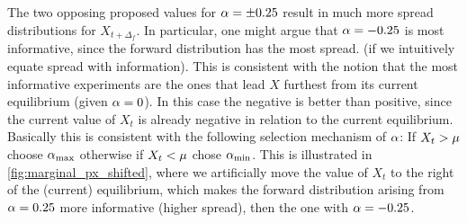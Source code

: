 The two opposing proposed values for $\alpha = \pm 0.25$ result in much
more spread distributions for $X_{t+\Delta_f}$. In particular, one might argue that
$\alpha=-0.25$ is most informative, since the forward distribution has the most
spread. (if we intuitively equate spread with information). This is consistent
with the notion that the most informative experiments are the ones that lead $X$
furthest from its current equilibrium (given $\alpha=0$). In this case the negative
is better than positive, since the current value of $X_t$ is already negative in
relation to the current equilibrium. Basically this is consistent with the
following selection mechanism of $\alpha$: If $X_t > {\mu }$ choose ${ \alpha_{\textrm{max}} }$ otherwise
if $X_t < {\mu }$ chose ${ \alpha_{\textrm{min}} }$. This is illustrated in
\cref{fig:marginal_px_shifted}, where we artificially move the value of $X_t$ to
the right of the (current) equilibrium, which makes the forward distribution
arising from $\alpha=0.25$ more informative (higher spread), then the one with
$\alpha=-0.25$.

